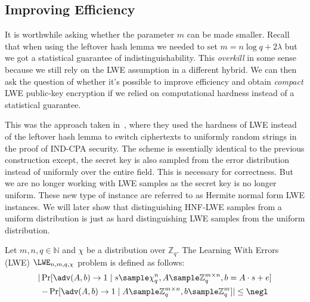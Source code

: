 \subsection{Improving Efficiency}
It is worthwhile asking whether the parameter $m$ can be made smaller. Recall that when using the leftover hash lemma we needed to set $m = n\log{q} + 2\lambda$ but we got a statistical guarantee of indistinguishability. This \emph{overkill} in some sense because we still rely on the LWE assumption in a different hybrid. We can then ask the question of whether it's possible to improve efficiency and obtain \emph{compact} LWE public-key encryption if we relied on computational hardness instead of a statistical guarantee.

This was the approach taken in~\cite{RSA:LinPei11}, where they used the hardness of LWE instead of the leftover hash lemma to switch ciphertexts to uniformly random strings in the proof of IND-CPA security. The scheme is essentially identical to the previous construction except, the secret key is also sampled from the error distribution instead of uniformly over the entire field. This is necessary for correctness. But we are no longer working with LWE samples as the secret key is no longer uniform. These new type of instance are referred to as Hermite normal form LWE instances. We will later show that distinguishing HNF-LWE samples from a uniform distribution is just as hard distinguishing LWE samples from the uniform distribution.

\begin{definition}
    Let $m,n,q \in \mathbb{N}$ and $\chi$ be a distribution over $\mathbb{Z}_q$. The Learning With Errors (LWE) $\LWE_{n,m,q,\chi}$ problem is defined as follows:
    \begin{multline*}
        |\Pr[\adv(A,b) \to 1 \mid s \sample \chi_q^n, A \sample \mathbb{Z}_q^{m \times n}, b = A \cdot s + e ] \\
        - \Pr[\adv(A,b) \to 1 \mid A \sample \mathbb{Z}_q^{m \times n}, b \sample \mathbb{Z}_q^m ]|\leq \negl
    \end{multline*}
\end{definition}

